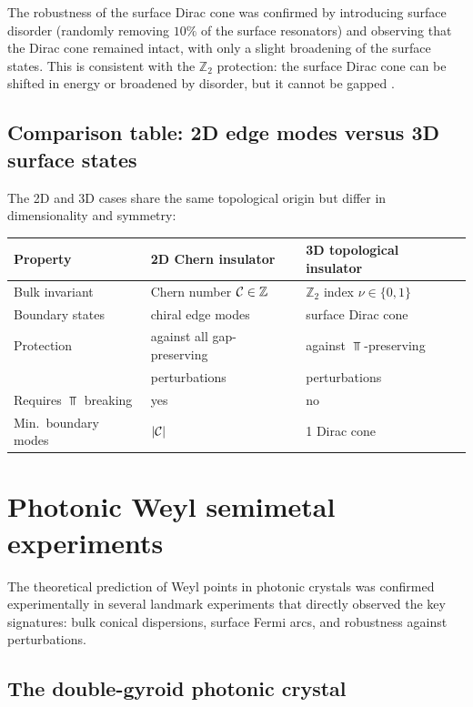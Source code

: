 The robustness of the surface Dirac cone was confirmed by introducing
surface disorder (randomly removing $10\%$ of the surface resonators)
and observing that the Dirac cone remained intact, with only a slight
broadening of the surface states.  This is consistent with the
$\mathbb{Z}_2$ protection: the surface Dirac cone can be shifted in
energy or broadened by disorder, but it cannot be gapped
\cite{price2022roadmap}.

\subsection{Comparison table: 2D edge modes versus 3D surface states}
\label{sec:ch15-comparison-2d-3d}

The 2D and 3D cases share the same topological origin but differ in
dimensionality and symmetry:
\begin{center}
\begin{tabular}{lll}
  \toprule
  Property & 2D Chern insulator & 3D topological insulator \\
  \midrule
  Bulk invariant & Chern number $\mathcal{C}\in\mathbb{Z}$ &
    $\mathbb{Z}_2$ index $\nu\in\{0,1\}$ \\
  Boundary states & chiral edge modes & surface Dirac cone \\
  Protection & against all gap-preserving & against $\Top$-preserving \\
  & perturbations & perturbations \\
  Requires $\Top$ breaking & yes & no \\
  Min.\ boundary modes & $|\mathcal{C}|$ & 1 Dirac cone \\
  \bottomrule
\end{tabular}
\end{center}

\section{Photonic Weyl semimetal experiments}
\label{sec:ch15-weyl-experiments}

The theoretical prediction of Weyl points in photonic crystals was
confirmed experimentally in several landmark experiments that
directly observed the key signatures: bulk conical dispersions,
surface Fermi arcs, and robustness against perturbations.

\subsection{The double-gyroid photonic crystal}
\label{sec:ch15-double-gyroid}

